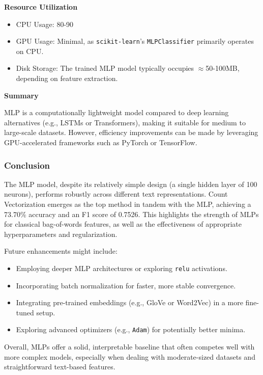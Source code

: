 \textbf{Resource Utilization}

\begin{itemize} \item CPU Usage: 80-90%
\item GPU Usage: Minimal, as \texttt{scikit-learn}’s \texttt{MLPClassifier} primarily operates on CPU.
\item Disk Storage: The trained MLP model typically occupies $\approx$50-100MB, depending on feature extraction.
\end{itemize}

\textbf{Summary}

MLP is a computationally lightweight model compared to deep learning alternatives (e.g., LSTMs or Transformers), making it suitable for medium to large-scale datasets. However, efficiency improvements can be made by leveraging GPU-accelerated frameworks such as PyTorch or TensorFlow.

\subsubsection{Conclusion}

The MLP model, despite its relatively simple design (a single hidden layer of 100 neurons), performs robustly across different text representations. Count Vectorization emerges as the top method in tandem with the MLP, achieving a 73.70\% accuracy and an F1 score of 0.7526. This highlights the strength of MLPs for classical bag-of-words features, as well as the effectiveness of appropriate hyperparameters and regularization.

Future enhancements might include:

\begin{itemize}
    \item Employing deeper MLP architectures or exploring \texttt{relu} activations.
    \item Incorporating batch normalization for faster, more stable convergence.
    \item Integrating pre-trained embeddings (e.g., GloVe or Word2Vec) in a more fine-tuned setup.
    \item Exploring advanced optimizers (e.g., \texttt{Adam}) for potentially better minima.
\end{itemize}

Overall, MLPs offer a solid, interpretable baseline that often competes well with more complex models, especially when dealing with moderate-sized datasets and straightforward text-based features.

\newpage